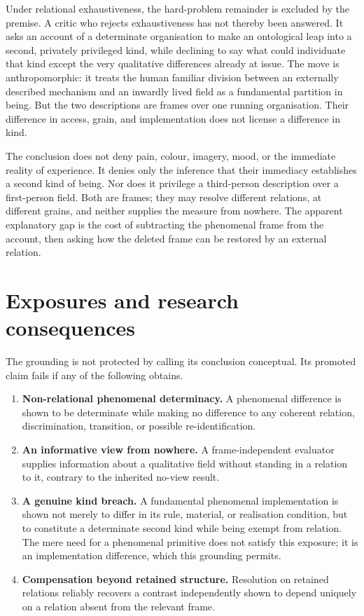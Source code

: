 \documentclass[11pt,a4paper]{article}
\theoremstyle{remark}\newtheorem{remark}[definition]{Remark}
\begin{document}
Under relational exhaustiveness, the hard-problem remainder is excluded by the premise. A critic who rejects exhaustiveness has not thereby been answered. It asks an account of a determinate organisation to make an
ontological leap into a second, privately privileged kind, while declining to say
what could individuate that kind except the very qualitative differences already
at issue. The move is anthropomorphic: it treats the human familiar division
between an externally described mechanism and an inwardly lived field as a
fundamental partition in being. But the two descriptions are frames over one
running organisation. Their difference in access, grain, and implementation does
not license a difference in kind.

The conclusion does not deny pain, colour, imagery, mood, or the immediate reality
of experience. It denies only the inference that their immediacy establishes a
second kind of being. Nor does it privilege a third-person description over a
first-person field. Both are frames; they may resolve different relations, at
different grains, and neither supplies the measure from nowhere. The apparent
explanatory gap is the cost of subtracting the phenomenal frame from the account,
then asking how the deleted frame can be restored by an external relation.

\section{Exposures and research consequences}\label{sec:exposures}

The grounding is not protected by calling its conclusion conceptual. Its promoted
claim fails if any of the following obtains.
\begin{enumerate}[leftmargin=*]
\item \textbf{Non-relational phenomenal determinacy.} A phenomenal difference is
shown to be determinate while making no difference to any coherent relation,
discrimination, transition, or possible re-identification.
\item \textbf{An informative view from nowhere.} A frame-independent evaluator
supplies information about a qualitative field without standing in a relation to
it, contrary to the inherited no-view result.
\item \textbf{A genuine kind breach.} A fundamental phenomenal implementation is
shown not merely to differ in its rule, material, or realisation condition, but to
constitute a determinate second kind while being exempt from relation. The mere
need for a phenomenal primitive does not satisfy this exposure; it is an
implementation difference, which this grounding permits.
\item \textbf{Compensation beyond retained structure.} Resolution on retained
relations reliably recovers a contrast independently shown to depend uniquely on
a relation absent from the relevant frame.
\end{enumerate}
\end{document}
